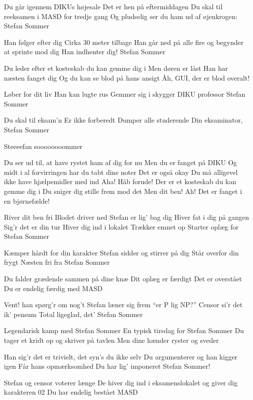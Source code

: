 \documentclass{article}
\begin{document}
\begin{song}
%
Du går igennem DIKUs højesale
Det er hen på eftermiddagen
Du skal til reeksamen i MASD for tredje gang
Og pludselig ser du ham ud af øjenkrogen:
Stefan Sommer

Han følger efter dig
Cirka 30 meter tilbage
Han går ned på alle fire og begynder at sprinte mod dig
Han indhenter dig!
Stefan Sommer

 Du leder efter et kosteskab du kan gemme dig i
Men døren er låst
Han har næsten fanget dig
Og du kan se blod på hans ansigt
Åh, GUI, der er blod overalt!

Løber for dit liv
Han kan lugte rus
Gemmer sig i skygger
DIKU professor Stefan Sommer



 Du skal til eksam’n
Er ikke forberedt
Dumper alle studerende
Din eksaminator, Stefan Sommer

 Steeeefan soooooooommer 

 
 Du ser ud til, at have rystet ham af dig for nu
Men du er fanget på DIKU
Og midt i al forvirringen har du tabt dine noter
Det er også okay
Du må alligevel ikke have hjælpemidler med ind
Aha! Håb forude!
Der er et kosteskab du kan gemme dig i
Du sniger dig stille frem mod det
 Men dit ben! Ah! Det er fanget i en bjørnefælde!
 

 River dit ben fri
Blodet driver ned
Stefan er lig’ bag dig
Hiver fat i dig på gangen
Sig’r det er din tur
Hiver dig ind i lokalet
Trækker emnet op
Starter oplæg for Stefan Sommer

 Kæmper hårdt for din karakter
Stefan sidder og stirrer på dig
Står overfor din frygt
Næsten fri fra Stefan Sommer

Du falder grædende sammen på dine knæ
Dit oplæg er færdigt
Det er overstået
Du er endelig færdig med MASD

Vent! han spørg’r om nog’t
Stefan læner sig frem “er P lig NP?”
Censor si’r det ik’ pensum 
Total ligeglad, det’ Stefan Sommer 

Legendarisk kamp med Stefan Sommer
En typisk tirsdag for Stefan Sommer
Du tager et kridt op og skriver på tavlen
Men dine hænder ryster og sveder

Han sig’r det er trivielt, det syn’s du ikke selv
Du argumenterer og han kigger igen
Får hans opmærksomhed
Du har lig’ imponeret Stefan Sommer!

Stefan og censor voterer længe
De hiver dig ind i eksamenslokalet og giver dig karakteren 02
Du har endelig bestået MASD

\end{song}

\end{document}

